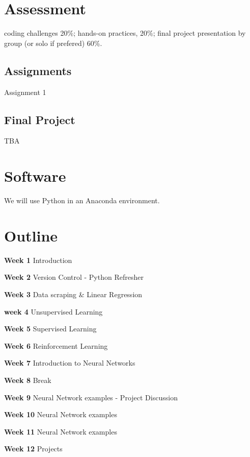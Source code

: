 \documentclass[
]{book}
\begin{document}
\hypertarget{assessment}{%
\section{Assessment}\label{assessment}}

coding challenges 20\%; hands-on practices, 20\%; final project presentation by group (or solo if prefered) 60\%.

\hypertarget{assignments}{%
\subsection{Assignments}\label{assignments}}

Assignment 1

\hypertarget{final-project}{%
\subsection{Final Project}\label{final-project}}

TBA

\hypertarget{software}{%
\section{Software}\label{software}}

We will use Python in an Anaconda environment.

\hypertarget{outline}{%
\section{Outline}\label{outline}}

\textbf{Week 1} Introduction

\textbf{Week 2} Version Control - Python Refresher

\textbf{Week 3} Data scraping \& Linear Regression

\textbf{week 4} Unsupervised Learning

\textbf{Week 5} Supervised Learning

\textbf{Week 6} Reinforcement Learning

\textbf{Week 7} Introduction to Neural Networks

\textbf{Week 8} Break

\textbf{Week 9} Neural Network examples - Project Discussion

\textbf{Week 10} Neural Network examples

\textbf{Week 11} Neural Network examples

\textbf{Week 12} Projects
\end{document}
